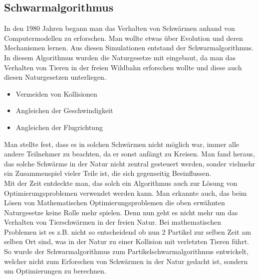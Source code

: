 \subsection{Schwarmalgorithmus}

In den 1980 Jahren begann man das Verhalten von Schwärmen anhand von Computermodellen zu erforschen. Man wollte etwas über Evolution und deren Mechanismen lernen. Aus diesen Simulationen entstand der Schwarmalgorithmus.
In diesem Algorithmus wurden die Naturgesetze mit eingebaut, da man das Verhalten von Tieren in der freien Wildbahn erforschen wollte und diese auch diesen Naturgesetzen unterliegen.

\begin{itemize}
\item Vermeiden von Kollisionen 
\item Angleichen der Geschwindigkeit
\item Angleichen der Flugrichtung
\end{itemize}

Man stellte fest, dass es in solchen Schwärmen nicht möglich war, immer alle andere Teilnehmer zu beachten, da er sonst anfängt zu Kreisen. Man fand heraus, das solche Schwärme in der Natur nicht zentral gesteuert werden, sonder vielmehr ein Zusammenspiel vieler Teile ist, die sich gegenseitig Beeinflussen.\\
Mit der Zeit entdeckte man, das solch ein Algorithmus auch zur Lösung von Optimierungsproblemen verwendet werden kann.
Man erkannte auch, das beim Lösen von Mathematischen Optimierungsproblemen die oben erwähnten Naturgesetze keine Rolle mehr spielen. Denn nun geht es nicht mehr um das Verhalten von Tierschwärmen in der freien Natur. Bei mathematischen Problemen ist es z.B. nicht so entscheidend ob nun 2 Partikel zur selben Zeit am selben Ort sind, was in der Natur zu einer Kollision mit verletzten Tieren führt. So wurde der Schwarmalgorithmus zum Partikelschwarmalgorithmus entwickelt, welcher nicht zum Erforschen von Schwärmen in der Natur gedacht ist, sondern um Optimierungen zu berechnen.
